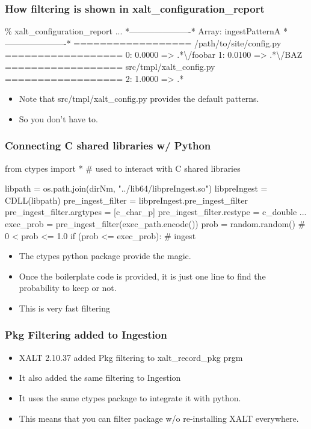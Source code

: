 \documentclass{beamer}
\begin{document}
\begin{frame}[fragile]
    \frametitle{How filtering is shown in xalt\_configuration\_report}
 {\tiny
    \begin{semiverbatim}
\% xalt\_configuration\_report
...        
*----------------------*
 Array: ingestPatternA
*----------------------*
================== /path/to/site/config.py ==================
   0: 0.0000 => .*\textbackslash{}/foobar
   1: 0.0100 => .*\textbackslash{}/BAZ
================== src/tmpl/xalt\_config.py ==================
   2: 1.0000 => .*
    \end{semiverbatim}
}
  \begin{itemize}
    \item Note that src/tmpl/xalt\_config.py  provides the default
      patterns.
    \item So you don't have to.
  \end{itemize}

\end{frame}

\begin{frame}[fragile]
    \frametitle{Connecting C shared libraries w/ Python}
 {\tiny
    \begin{semiverbatim}
from   ctypes import *   # used to interact with C shared libraries

libpath      = os.path.join(dirNm, "../lib64/libpreIngest.so")
libpreIngest = CDLL(libpath)
pre\_ingest\_filter = libpreIngest.pre\_ingest\_filter
pre\_ingest\_filter.argtypes = [c\_char\_p]
pre\_ingest\_filter.restype  = c\_double
...
exec\_prob = pre\_ingest\_filter(exec\_path.encode())
prob      = random.random() # 0 < prob <= 1.0
if (prob <= exec\_prob):
   # ingest

    \end{semiverbatim}
}
  \begin{itemize}
    \item The ctypes python package provide the magic.
    \item Once the boilerplate code is provided, it is just one line
      to find the probability to keep or not.
    \item This is very fast filtering 
  \end{itemize}
\end{frame}

\begin{frame}[fragile]
    \frametitle{Pkg Filtering added to Ingestion}
  \begin{itemize}
    \item XALT 2.10.37 added Pkg filtering to xalt\_record\_pkg prgm
    \item It also added the same filtering to Ingestion 
    \item It uses the same ctypes package to integrate it with python.
    \item This means that you can filter package w/o re-installing
      XALT everywhere.
  \end{itemize}
\end{frame}
\end{document}
